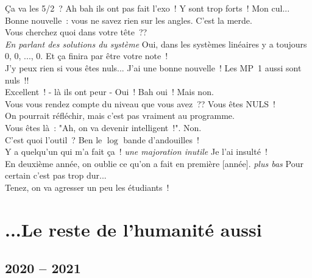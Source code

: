 \documentclass[french, a4paper, openany]{book}
\begin{document}
	\og Ça va les 5/2~? Ah bah ils ont pas fait l'exo~! Y sont trop forts~! Mon cul... \fg \\
	\og Bonne nouvelle~: vous ne savez rien sur les angles. C'est la merde. \fg \\
	\og Vous cherchez quoi dans votre tête~?? \fg \\
	\emph{En parlant des solutions du système} \og Oui, dans les systèmes linéaires y a toujours 0, 0, ..., 0. Et ça finira par être votre note~! \fg \\
	\og J'y peux rien si vous êtes nuls... J'ai une bonne nouvelle~! Les MP~1 aussi sont nuls~!! \fg \\
	\og Excellent~! - là ils ont peur - Oui~! Bah oui~! Mais non. \fg \\
	\og Vous vous rendez compte du niveau que vous avez~?? Vous êtes NULS~! \fg \\
	\og On pourrait réfléchir, mais c'est pas vraiment au programme. \fg \\
	\og Vous êtes là~: "Ah, on va devenir intelligent~!". Non. \fg \\
	\og C'est quoi l'outil~? Ben le $\log$ bande d'andouilles~! \fg \\
	\og Y a quelqu'un qui m'a fait ça~! \emph{une majoration inutile} Je l'ai insulté~! \fg \\
	\og En deuxième année, on oublie ce qu'on a fait en première [année]. \emph{plus bas} Pour certain c'est pas trop dur... \fg \\
	\og Tenez, on va agresser un peu les étudiants~! \fg \\
	
\section*{...Le reste de l'humanité aussi}

	\subsection*{2020 -- 2021}
\end{document}
